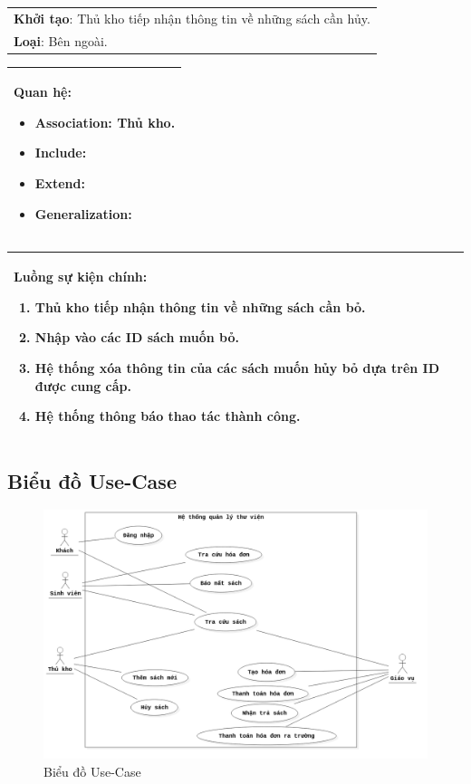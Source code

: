 \documentclass[../report.tex]{subfiles}
\begin{document}
\begin{center}
\begin{tabular}{| m{15.9cm} |}
    \hline
    \textbf{Khởi tạo}: Thủ kho tiếp nhận thông tin về những sách cần hủy. \\
    \textbf{Loại}: Bên ngoài.  \\
    \hline
\end{tabular}

\begin{tabular}{| m{15.9cm} |}
    \hline
    \textbf{Quan hệ}:
    \begin{itemize}
        \item Association: Thủ kho. 
        \item Include: 
        \item Extend: 
        \item Generalization: 
    \end{itemize} \\
    \hline
\end{tabular}

\begin{tabular}{| m{15.9cm} |}
    \hline
    \textbf{Luồng sự kiện chính}:
    \begin{enumerate}
        \item Thủ kho tiếp nhận thông tin về những sách cần bỏ. 
        \item Nhập vào các ID sách muốn bỏ. 
        \item Hệ thống xóa thông tin của các sách muốn hủy bỏ dựa trên ID được cung cấp. 
        \item Hệ thống thông báo thao tác thành công. 
    \end{enumerate} \\
    \hline
\end{tabular}

\end{center}

\subsection{Biểu đồ Use-Case}
\begin{figure}[H]
\centering
\includegraphics[width=\textwidth]{figures/usecase.png}
\caption{Biểu đồ Use-Case}
\end{figure}
\end{document}
